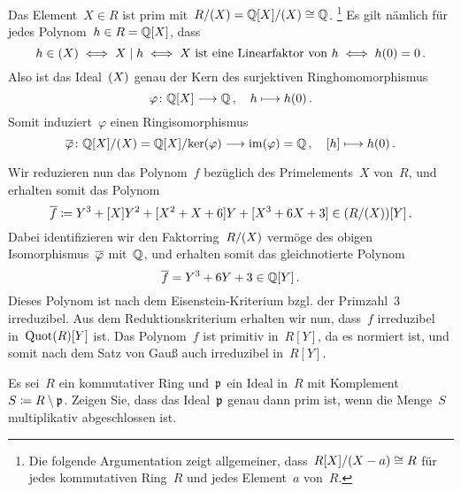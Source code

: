 \documentclass{scrartcl}
\begin{document}
\begin{solution}
\begin{enumerate}
      Das Element~$X \in R$ ist prim mit~$R / (X) = \mathbb{Q}[X] / (X) \cong \mathbb{Q}$.%
      \footnote{
        Die folgende Argumentation zeigt allgemeiner, dass~$R[X] / (X-a) \cong R$ für jedes kommutativen Ring~$R$ und jedes Element~$a$ von~$R$.
      }
      Es gilt nämlich für jedes Polynom~$h \in R = \mathbb{Q}[X]$, dass
      \[
        h \in (X)
        \iff
        X \mid h
        \iff
        \text{$X$ ist eine Linearfaktor von~$h$}
        \iff
        h(0) = 0 \,.
      \]
      Also ist das Ideal~$(X)$ genau der Kern des surjektiven Ringhomomorphismus
      \[
        \varphi
        \colon
        \Rational[X]
        \to
        \Rational \,,
        \quad
        h
        \mapsto
        h(0) \,.
      \]
      Somit induziert~$\varphi$ einen Ringisomorphismus
      \[
        \induced{\varphi}
        \colon
        \Rational[X] / \genideal{X}
        =
        \Rational[X] / {\ker(\varphi)}
        \to
        \im(\varphi)
        =
        \Rational \,,
        \quad
        \class{ h }
        \mapsto
        h(0) \,.
      \]

      Wir reduzieren nun das Polynom~$f$ bezüglich des Primelements~$X$ von~$R$, und erhalten somit das Polynom
      \[
        \overline{f}
        \coloneqq
        Y^3
        +
        [ X ] Y^2
        +
        [ X^2 + X + 6 ] Y
        +
        [ X^3 + 6X + 3 ]
        \in
        ( R / (X) )[Y] \,.
      \]
      Dabei identifizieren wir den Faktorring~$R / (X)$ vermöge des obigen Isomorphismus~$\overline{\varphi}$ mit~$\mathbb{Q}$, und erhalten somit das gleichnotierte Polynom
      \[
        \overline{f}
        =
        Y^3 + 6Y + 3
        \in
        \mathbb{Q}[Y] \,.
      \]
      Dieses Polynom ist nach dem Eisenstein-Kriterium bzgl. der Primzahl~$3$ irreduzibel.
      Aus dem Reduktionskriterium erhalten wir nun, dass~$f$ irreduzibel in~$\operatorname{Quot}(R)[Y]$ ist.
      Das Polynom~$f$ ist primitiv in~$R[Y]$, da es normiert ist, und somit nach dem Satz von Gauß auch irreduzibel in~$R[Y]$.
  \end{enumerate}
\end{solution}

\begin{exercise}
  Es sei~$R$ ein kommutativer Ring und~$\mathfrak{p}$ ein Ideal in~$R$ mit Komplement~$S \coloneqq R \setminus \mathfrak{p}$.
  Zeigen Sie, dass das Ideal~$\mathfrak{p}$ genau dann prim ist, wenn die Menge~$S$ multiplikativ abgeschlossen ist.
\end{exercise}
\end{document}
